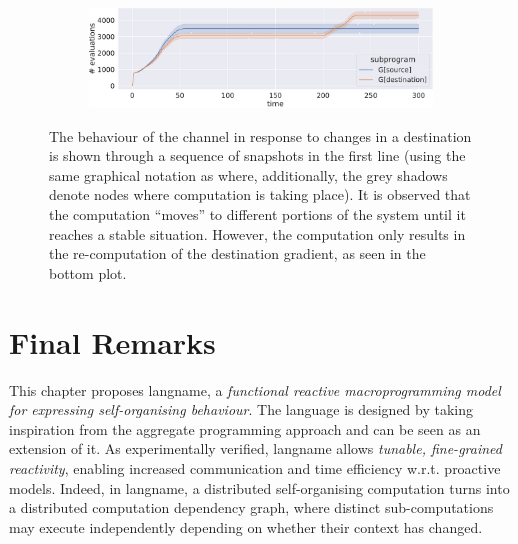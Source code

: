 \begin{figure}
\begin{subfigure}[b]{0.24\linewidth}
      \caption{}
      \label{acsos2023-frp:fig:finish}
  \end{subfigure}\hfill
  \begin{subfigure}[b]{\linewidth}
    \centering
    \includegraphics[width=\textwidth]{papers/acsos2023-frp/imgs/message_count.pdf}
  \end{subfigure}
  \caption[behaviour of the channel in response to changes in a destination]{
  The behaviour of the channel in response to changes in a destination is shown through a sequence of snapshots in the first line (using the same graphical notation as  where, additionally, the grey shadows denote nodes where computation is taking place). 
  It is observed that the computation ``moves'' to different portions of the system until it reaches a stable situation. 
  However, the computation only results in the re-computation of the destination gradient, as seen in the bottom plot.
  }
  \label{acsos2023-frp:fig:subprogram-eval}
\end{figure}

\section{Final Remarks}
\label{acsos2023-frp:sec:conc}

This chapter proposes \ac{langname},
 a \emph{functional reactive macroprogramming model
 for expressing self-organising behaviour}.
%
The language is designed by taking inspiration 
 from the aggregate programming approach and can be seen as an extension of it.
%
As experimentally verified,
 \ac{langname} allows \emph{tunable, fine-grained reactivity},
 enabling increased communication and time efficiency
 w.r.t. proactive models.
%
Indeed, in \ac{langname},
 a distributed self-organising computation
 turns into a distributed computation dependency graph,
 where distinct sub-computations may execute independently 
 depending on whether their context has changed.

